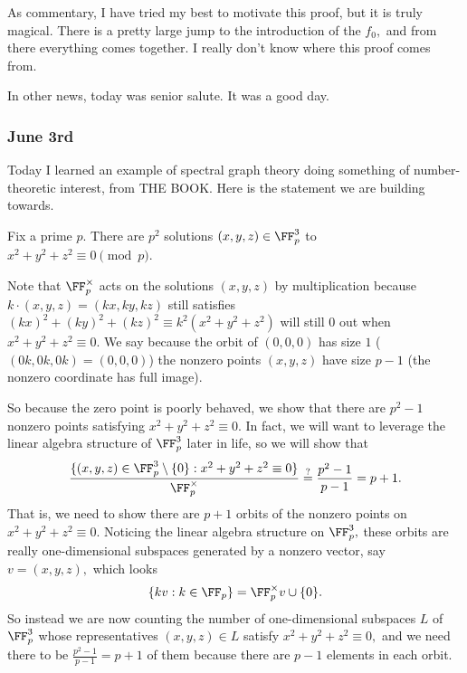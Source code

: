 As commentary, I have tried my best to motivate this proof, but it is truly magical. There is a pretty large jump to the introduction of the $f_0,$ and from there everything comes together. I really don't know where this proof comes from.

In other news, today was senior salute. It was a good day.

\subsubsection{June 3rd}
Today I learned an example of spectral graph theory doing something of number-theoretic interest, from THE BOOK. Here is the statement we are building towards.
\begin{theorem}
    Fix a prime $p.$ There are $p^2$ solutions $(x,y,z)\in\FF_p^3$ to $x^2+y^2+z^2\equiv0\pmod p.$
\end{theorem}
Note that $\FF_p^\times$ acts on the solutions $(x,y,z)$ by multiplication because $k\cdot(x,y,z)=(kx,ky,kz)$ still satisfies $(kx)^2+(ky)^2+(kz)^2\equiv k^2\left(x^2+y^2+z^2\right)$ will still $0$ out when $x^2+y^2+z^2\equiv0.$ We say because the orbit of $(0,0,0)$ has size $1$ ($(0k,0k,0k)=(0,0,0)$) the nonzero points $(x,y,z)$ have size $p-1$ (the nonzero coordinate has full image).

So because the zero point is poorly behaved, we show that there are $p^2-1$ nonzero points satisfying $x^2+y^2+z^2\equiv0.$ In fact, we will want to leverage the linear algebra structure of $\FF_p^3$ later in life, so we will show that
\[\frac{\{(x,y,z)\in\FF_p^3\setminus\{0\}:x^2+y^2+z^2\equiv0\}}{\FF_p^\times}\stackrel?=\frac{p^2-1}{p-1}=p+1.\]
That is, we need to show there are $p+1$ orbits of the nonzero points on $x^2+y^2+z^2\equiv0.$ Noticing the linear algebra structure on $\FF_p^3,$ these orbits are really one-dimensional subspaces generated by a nonzero vector, say $v=(x,y,z),$ which looks
\[\{kv:k\in\FF_p\}=\FF_p^\times v\cup\{0\}.\]
So instead we are now counting the number of one-dimensional subspaces $L$ of $\FF_p^3$ whose representatives $(x,y,z)\in L$ satisfy $x^2+y^2+z^2\equiv0,$ and we need there to be $\frac{p^2-1}{p-1}=p+1$ of them because there are $p-1$ elements in each orbit.

